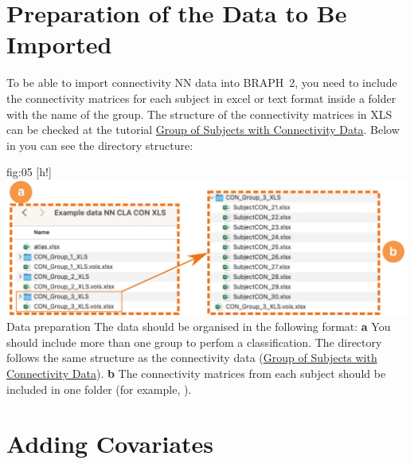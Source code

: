 \documentclass[justified]{tufte-handout}
\begin{document}
\clearpage
\section{Preparation of the Data to Be Imported}

To be able to import connectivity NN data into BRAPH~2, you need to include the connectivity matrices for each subject in excel or text format inside a folder with the name of the group. The structure of the connectivity matrices in XLS can be checked at the tutorial \href{https://github.com/braph-software/BRAPH-2/tree/develop/tutorials/data/tut_gr_con}{Group of Subjects with Connectivity Data}. Below in  you can see the directory structure:

	{fig:05}
	{
	[h!]
	\includegraphics{fig05.jpg}
	}
	{Data preparation}
	{
	The data should be organised in the following format:
	{\bf a} You should include more than one group to perfom a classification. The directory follows the same structure as the connectivity data (\href{https://github.com/braph-software/BRAPH-2/tree/develop/tutorials/data/tut_gr_con}{Group of Subjects with Connectivity Data}). 
	{\bf b} The connectivity matrices from each subject should be included in one folder (for example, ). 
	} 


\section{Adding Covariates}
\end{document}
